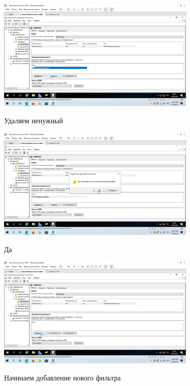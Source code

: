 \documentclass[a4paper]{article}
\begin{document}
  \begin{figure}[H]
    \centering
    \includegraphics[width=0.85\textwidth]{5_0162}
    \label{img:162}
    \caption{Удаляем ненужный}
  \end{figure}

  \begin{figure}[H]
    \centering
    \includegraphics[width=0.85\textwidth]{5_0163}
    \label{img:163}
    \caption{Да}
  \end{figure}

  \begin{figure}[H]
    \centering
    \includegraphics[width=0.85\textwidth]{5_0164}
    \label{img:164}
    \caption{Начинаем добавление нового фильтра}
  \end{figure}
\end{document}
